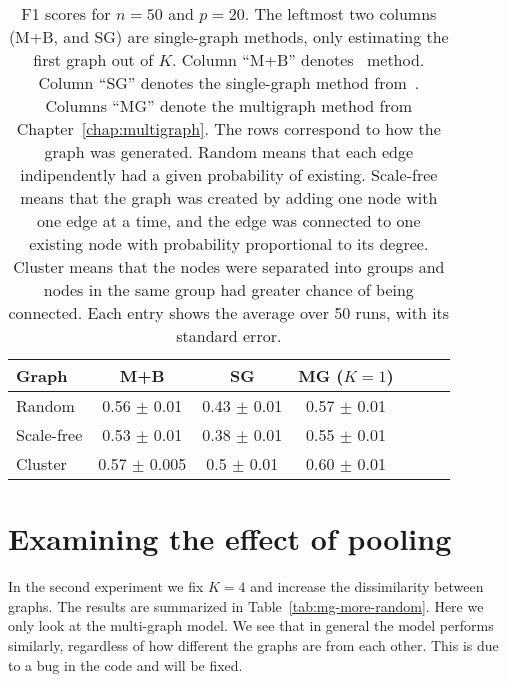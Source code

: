 \documentclass[a4paper, 11pt, oneside]{report}
\newcommand{\1}{\mathds{1}}
\begin{document}
\begin{table}[ht]
	\caption{F1 scores for $n=50$ and $p=20$.
		The leftmost two columns (M+B, and SG) are single-graph methods,
		only estimating the first graph out of $K$.
		Column ``M+B'' denotes~\citet{mein2006} method.
		Column ``SG'' denotes the single-graph method from~\citet{limcco-2017}.
		Columns ``MG'' denote the multigraph method from Chapter~\ref{chap:multigraph}.
		The rows correspond to how the graph was generated.
		Random means that each edge indipendently had a given probability of existing.
		Scale-free means that the graph was created by adding one node with one edge at a time, and the edge was connected to one existing node with probability proportional to its degree.
		Cluster means that the nodes were separated into groups and nodes in the same group had greater chance of being connected.
		Each entry shows the average over 50 runs, with its standard error. }
	\label{tab:mg-more-graphs}
	\begin{center}
		\begin{tabular}[c]{l|cccccc}
			\toprule
			Graph      & M+B              & SG              & MG ($K = 1$)    \\
			\midrule
			Random     & 0.56 $\pm$ 0.01  & 0.43 $\pm$ 0.01 & 0.57 $\pm$ 0.01 \\
			\midrule
			Scale-free & 0.53 $\pm$ 0.01  & 0.38 $\pm$ 0.01 & 0.55 $\pm$ 0.01 \\
			\midrule
			Cluster    & 0.57 $\pm$ 0.005 & 0.5 $\pm$ 0.01  & 0.60 $\pm$ 0.01 \\
			\bottomrule
		\end{tabular}
	\end{center}
\end{table}

\section{Examining the effect of pooling}\label{sect:perf-self}
In the second experiment we fix $K=4$ and increase the dissimilarity between graphs.
The results are summarized in Table~\ref{tab:mg-more-random}.
Here we only look at the multi-graph model.
We see that in general the model performs similarly,
regardless of how different the graphs are from each other.
This is due to a bug in the code and will be fixed.
\end{document}
